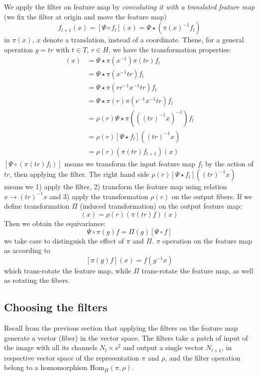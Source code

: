 \documentclass{article}
\begin{document}
We apply the filter on feature map by \emph{convoluting it with a translated 
feature map} (we fix the filter at origin and move the feature map)
\begin{equation}
    f_{l+1}(x) = [\Psi \circ f_l](x) = \Psi \star ( \pi(x)^{-1} f_l )
\end{equation}
in $\pi(x)$, $x$ denote a translation, instead of a coordinate. 
Thene, for a general operation $g = tr$ with $t\in T$, $r \in H$, we have the transformation 
properties:
\begin{align*}
    [\Psi \circ (\pi(tr)f_l)](x) 
        &= \Psi \star \pi(x^{-1})\pi(tr) f_l \\
        &= \Psi \star \pi(x^{-1}tr) f_l \\
        &= \Psi \star \pi(rr^{-1}x^{-1}tr) f_l \\
        &= \Psi \star \pi(r) \pi(r^{-1}x^{-1}tr) f_l \\
        &= \rho(r) \Psi \star \pi\left(\left((tr)^{-1}x\right)^{-1}\right) f_l \\
        &= \rho(r) [ \Psi \star  f_l ]  ((tr)^{-1}x)\\
        &= \rho(r) (\pi(tr) f_{l+1}) (x) 
\end{align*}
$[\Psi \circ (\pi(tr)f_l)]$ means we transform the input feature map $f_l$ by the action of $tr$, then applying the filter. The right hand side
$\rho(r) [ \Psi \star  f_l ]  ((tr)^{-1}x)$ means we 
1) apply the filter, 
2) transform the feature map using relation $x\to(tr)^{-1}x$ and 
3) apply the transformation $\rho(r)$ on the output fibers.
If we define transformation $\Pi$ (induced transformation) on the output feature map:
\begin{equation}
    [\Pi(tr) f ](x)= \rho(r) (\pi(tr) f) (x) \label{induced_transformation}
\end{equation}
Then we obtain the equivariance:
\begin{equation}
    \tag{Equivariance}
    \Psi \circ \pi(g) f = \Pi(g) [\Psi \circ f]
\end{equation}
we take care to distinguish the effect of $\pi$ and $\Pi$. $\pi$ operation on the feature map as according to 
\[[\pi(g) f](x) = f(g^{-1}x)\]
which trans-rotate the feature map, 
while $\Pi$ trans-rotate the feature map, as well as rotating the fibers.

\subsection*{Choosing the filters}
Recall from the previous section that 
applying the filters on the feature map generate a vector (fiber) in the vector space. 
The filters take a patch of input of the image with all its channels $N_l\times s^2$ and output a single vector $N_{l+1}$, in respective vector space of the 
representation $\pi$ and $\rho$, and the filter operation belong to a homomorphism $\text{Hom}_H(\pi, \rho)$. 
\end{document}
